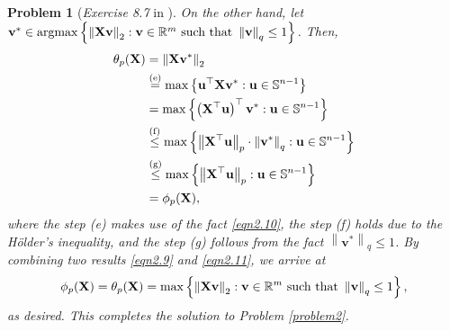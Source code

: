 \documentclass[11pt]{article}
\newtheorem{problem}{Problem}
\DeclareMathOperator*{\argmax}{argmax}
\numberwithin{equation}{problem}
\begin{document}
\begin{problem} [\emph{Exercise 8.7} in \cite{calafiore2014optimization}]
{\indent On the other hand, let $\mathbf{v}^* \in \argmax \left\{ \left\| \mathbf{X} \mathbf{v} \right\|_2 : \mathbf{v} \in \mathbb{R}^m \textnormal{ such that } \left\| \mathbf{v} \right\|_q \leq 1 \right\}$. Then,
\begin{equation}
    \label{eqn2.11}
    \begin{split}
        \theta_p (\mathbf{X}) &= \left\| \mathbf{X} \mathbf{v}^* \right\|_2 \\
        &\stackrel{\textnormal{(e)}}{=} \max \left\{ \mathbf{u}^{\top} \mathbf{X} \mathbf{v}^* : \mathbf{u} \in \mathbb{S}^{n-1} \right\} \\
        &= \max \left\{ \left( \mathbf{X}^{\top} \mathbf{u} \right)^{\top} \mathbf{v}^* : \mathbf{u} \in \mathbb{S}^{n-1} \right\} \\
        &\stackrel{\textnormal{(f)}}{\leq} \max \left\{ \left\| \mathbf{X}^{\top} \mathbf{u} \right\|_p \cdot \left\| \mathbf{v}^* \right\|_q : \mathbf{u} \in \mathbb{S}^{n-1} \right\} \\
        &\stackrel{\textnormal{(g)}}{\leq} \max \left\{ \left\| \mathbf{X}^{\top} \mathbf{u} \right\|_p : \mathbf{u} \in \mathbb{S}^{n-1} \right\} \\
        &= \phi_p (\mathbf{X}),
    \end{split}
\end{equation}
where the step (e) makes use of the fact \eqref{eqn2.10}, the step (f) holds due to the H\"{o}lder's inequality, and the step (g) follows from the fact $\left\| \mathbf{v}^* \right\|_q \leq 1$. By combining two results \eqref{eqn2.9} and \eqref{eqn2.11}, we arrive at
\begin{equation*}
    \phi_p (\mathbf{X}) = \theta_p (\mathbf{X}) = \max \left\{ \left\| \mathbf{X} \mathbf{v} \right\|_2 : \mathbf{v} \in \mathbb{R}^m \textnormal{ such that } \left\| \mathbf{v} \right\|_q \leq 1 \right\},
\end{equation*}
as desired. This completes the solution to Problem \ref{problem2}.
}
\end{problem}

\newpage



\end{document}
